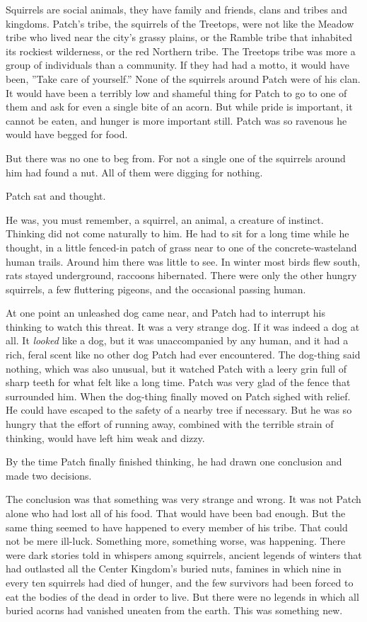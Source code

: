 \documentclass[11pt]{article}
\begin{document}
Squirrels are social animals, they have family and friends, clans and tribes and kingdoms. Patch's tribe, the squirrels of the Treetops, were not like the Meadow tribe who lived near the city's grassy plains, or the Ramble tribe that inhabited its rockiest wilderness, or the red Northern tribe. The Treetops tribe was more a group of individuals than a community. If they had had a motto, it would have been, ''Take care of yourself.'' None of the squirrels around Patch were of his clan. It would have been a terribly low and shameful thing for Patch to go to one of them and ask for even a single bite of an acorn. But while pride is important, it cannot be eaten, and hunger is more important still. Patch was so ravenous he would have begged for food.\par
But there was no one to beg from. For not a single one of the squirrels around him had found a nut. All of them were digging for nothing.\par
 Patch sat and thought.\par
He was, you must remember, a squirrel, an animal, a creature of instinct. Thinking did not come naturally to him. He had to sit for a long time while he thought, in a little fenced-in patch of grass near to one of the concrete-wasteland human trails. Around him there was little to see. In winter most birds flew south, rats stayed underground, raccoons hibernated. There were only the other hungry squirrels, a few fluttering pigeons, and the occasional passing human.\par
At one point an unleashed dog came near, and Patch had to interrupt his thinking to watch this threat. It was a very strange dog. If it was indeed a dog at all. It {\it looked} like a dog, but it was unaccompanied by any human, and it had a rich, feral scent like no other dog Patch had ever encountered. The dog-thing said nothing, which was also unusual, but it watched Patch with a leery grin full of sharp teeth for what felt like a long time. Patch was very glad of the fence that surrounded him. When the dog-thing finally moved on Patch sighed with relief. He could have escaped to the safety of a nearby tree if necessary. But he was so hungry that the effort of running away, combined with the terrible strain of thinking, would have left him weak and dizzy.\par
By the time Patch finally finished thinking, he had drawn one conclusion and made two decisions.\par
 The conclusion was that something was very strange and wrong. It was not Patch alone who had lost all of his food. That would have been bad enough. But the same thing seemed to have happened to every member of his tribe. That could not be mere ill-luck. Something more, something worse, was happening. There were dark stories told in whispers among squirrels, ancient legends of winters that had outlasted all the Center Kingdom's buried nuts, famines in which nine in every ten squirrels had died of hunger, and the few survivors had been forced to eat the bodies of the dead in order to live. But there were no legends in which all buried acorns had vanished uneaten from the earth. This was something new.\par
\end{document}
